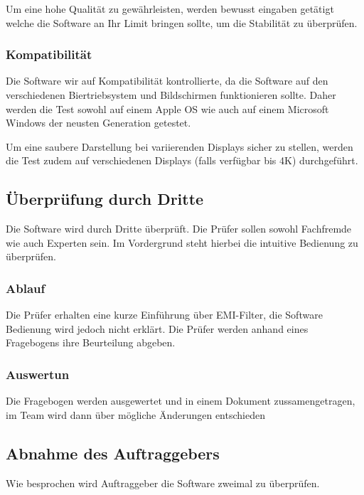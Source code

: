 Um eine hohe Qualität zu gewährleisten, werden bewusst eingaben getätigt welche die Software an Ihr Limit bringen sollte, um die Stabilität zu überprüfen. 

\subsubsection{Kompatibilität} \label{subsubsec:2}
 
Die Software wir auf Kompatibilität kontrollierte, da die Software auf den verschiedenen Biertriebsystem und Bildschirmen funktionieren sollte. Daher werden die Test sowohl auf  einem Apple OS wie auch auf einem Microsoft Windows der neusten Generation getestet.

Um eine saubere Darstellung bei variierenden Displays sicher zu stellen, werden die Test zudem auf verschiedenen Displays (falls verfügbar bis 4K) durchgeführt.

\subsection{Überprüfung durch Dritte} \label{subsec:4}

Die Software wird durch Dritte überprüft. Die Prüfer sollen sowohl Fachfremde wie auch Experten sein. Im Vordergrund steht hierbei die intuitive Bedienung zu überprüfen.

\subsubsection{Ablauf} \label{subsubsec:1}

Die Prüfer erhalten eine kurze Einführung über EMI-Filter, die Software Bedienung wird jedoch nicht erklärt. Die Prüfer werden anhand eines Fragebogens ihre Beurteilung abgeben.

\subsubsection{Auswertun} \label{subsubsec:2}

Die  Fragebogen  werden ausgewertet und  in einem Dokument zussamengetragen, im Team wird dann über mögliche Änderungen entschieden 

\subsection{Abnahme des Auftraggebers} \label{subsec:4}

Wie besprochen wird Auftraggeber die Software zweimal zu überprüfen.

